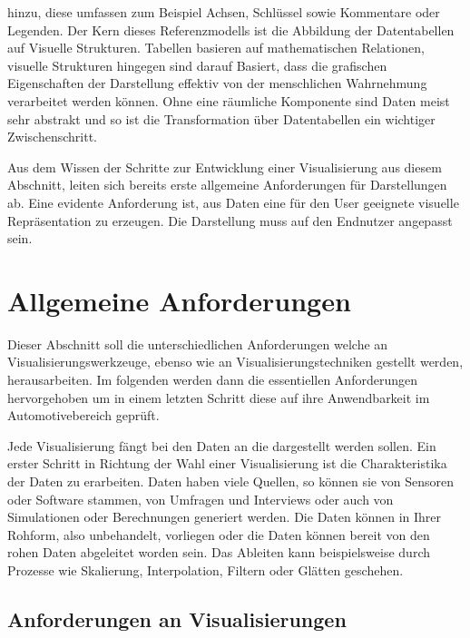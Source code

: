 \documentclass[draft=false
              ,paper=a4
              ,twoside=false
              ,fontsize=11pt
              ,headsepline
              ,BCOR10mm
              ,DIV11
              ]{scrbook}
\begin{document}
hinzu, diese umfassen zum Beispiel Achsen, Schlüssel sowie Kommentare oder Legenden. 
Der Kern dieses Referenzmodells ist die Abbildung der Datentabellen auf Visuelle Strukturen. Tabellen basieren auf mathematischen Relationen, visuelle Strukturen hingegen sind darauf Basiert, dass die grafischen Eigenschaften der Darstellung effektiv von der menschlichen Wahrnehmung verarbeitet werden können. Ohne eine räumliche Komponente sind Daten meist sehr abstrakt und so ist die Transformation über Datentabellen ein wichtiger Zwischenschritt.

Aus dem Wissen der Schritte zur Entwicklung einer Visualisierung aus diesem Abschnitt, leiten sich bereits erste allgemeine Anforderungen für Darstellungen ab. Eine evidente Anforderung ist, aus Daten eine für den User geeignete visuelle Repräsentation zu erzeugen. Die Darstellung muss auf den Endnutzer angepasst sein.

\section{Allgemeine Anforderungen} %
\label{sec:allgemeine_anforderungen}

Dieser Abschnitt soll die unterschiedlichen Anforderungen welche an Visualisierungswerkzeuge, ebenso wie an Visualisierungstechniken gestellt werden, herausarbeiten. Im folgenden werden dann die essentiellen Anforderungen hervorgehoben um in einem letzten Schritt diese auf ihre Anwendbarkeit im Automotivebereich geprüft. 

Jede Visualisierung fängt bei den Daten an die dargestellt werden sollen. Ein erster Schritt in Richtung der Wahl einer Visualisierung ist die Charakteristika der Daten zu erarbeiten. Daten haben viele Quellen, so können sie von Sensoren oder Software stammen, von Umfragen und Interviews oder auch von Simulationen oder Berechnungen generiert werden. Die Daten können in Ihrer Rohform, also unbehandelt, vorliegen oder die Daten können bereit von den rohen Daten abgeleitet worden sein. Das Ableiten kann beispielsweise durch Prozesse wie Skalierung, Interpolation, Filtern oder Glätten geschehen.  

\subsection{Anforderungen an Visualisierungen} %
\label{sub:anforderungen_an_visualisierungen}
\end{document}

